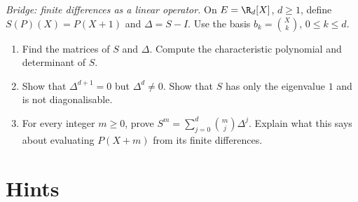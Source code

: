 \begin{exercise}[$\star\star$]\label{ex:bridge-translation}
\emph{Bridge: finite differences as a linear operator.} On $E=\R_d[X]$, $d\ge1$, define $S(P)(X)=P(X+1)$ and $\Delta=S-I$. Use the basis $b_k=\binom Xk$, $0\le k\le d$.
\begin{enumerate}[label=(\alph*)]
\item Find the matrices of $S$ and $\Delta$. Compute the characteristic polynomial and determinant of $S$.
\item Show that $\Delta^{d+1}=0$ but $\Delta^d\ne0$. Show that $S$ has only the eigenvalue $1$ and is not diagonalisable.
\item For every integer $m\ge0$, prove $S^m=\sum_{j=0}^d\binom mj\Delta^j$. Explain what this says about evaluating $P(X+m)$ from its finite differences.
\end{enumerate}
\end{exercise}

\section{Hints}

